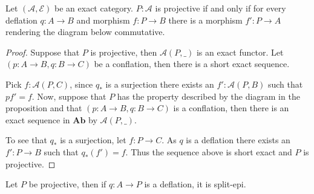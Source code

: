     \begin{prop}
        Let $(\mathcal{A},\mathcal{E})$ be an exact category. $P:\mathcal{A}$ is projective if and only if for every deflation $q:A\rightarrow B$ and morphism $f:P\rightarrow B$  there is a morphism $f':P\rightarrow A$ rendering the diagram below commutative.
        \begin{center}
        \end{center}
    \end{prop}

    \begin{proof}
        Suppose that $P$ is projective, then $\mathcal{A}(P,\_)$ is an exact functor. Let $(p:A\rightarrow B,q:B\rightarrow C)$ be a conflation, then there is a short exact sequence.
        \begin{center}
        \end{center}
        Pick $f:\mathcal{A}(P,C)$, since $q_*$ is a surjection there exists an $f':\mathcal{A}(P,B)$ such that $pf'=f$.
        Now, suppose that $P$ has the property described by the diagram in the proposition and that $(p:A\rightarrow B,q:B\rightarrow C)$ is a conflation, then there is an exact sequence in $\textbf{Ab}$ by $\mathcal{A}(P,\_)$.
        \begin{center}
        \end{center}
        To see that $q_*$ is a surjection, let $f:P\rightarrow C$. As $q$ is a deflation there exists an $f':P\rightarrow B$ such that $q_*(f')=f$. Thus the sequence above is short exact and $P$ is projective. 
    \end{proof}

    \begin{corollary}
        Let $P$ be projective, then if $q:A\rightarrow P$ is a deflation, it is split-epi.
    \end{corollary}

